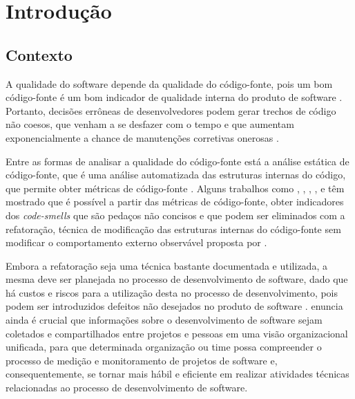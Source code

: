 \chapter{Introdução}

\section {Contexto}

A qualidade do software depende da qualidade do código-fonte, pois um bom código-fonte é um bom indicador de qualidade interna do produto de software \cite{beck2003test} \cite{ISO25023}. Portanto, decisões errôneas de desenvolvedores podem gerar trechos de código não coesos, que venham a se desfazer com o tempo e que aumentam exponencialmente a chance de manutenções corretivas onerosas \cite{beck2007implementation} \cite{beck1999}.


Entre as formas de analisar a qualidade do código-fonte está a análise estática de código-fonte, que é uma análise automatizada das estruturas internas do código, que permite obter métricas de código-fonte \cite{Emanuelsson2008} \cite{Wichmann95}  \cite{Nielson:1999} \cite{Sommerville10}. Alguns trabalhos como , , , ,  e   têm mostrado que é possível a partir das métricas de código-fonte, obter indicadores dos \textit{code-smells} que são pedaços não concisos e que podem ser eliminados com a refatoração, técnica de modificação das estruturas internas do código-fonte sem modificar o comportamento externo observável proposta por .


Embora a refatoração seja uma técnica bastante documentada e utilizada, a mesma deve ser planejada no processo de desenvolvimento de software, dado que há custos e riscos para a utilização desta no processo de desenvolvimento, pois podem ser introduzidos defeitos não desejados no produto de software \cite{yamashita2013assessing}.  enuncia ainda é crucial que informações sobre o desenvolvimento de software sejam coletados e compartilhados entre projetos e pessoas em uma visão organizacional unificada, para que determinada organização ou time possa compreender o processo de medição e monitoramento de projetos de software e, consequentemente, se tornar mais hábil e eficiente em realizar atividades técnicas relacionadas ao processo de desenvolvimento de software. 


